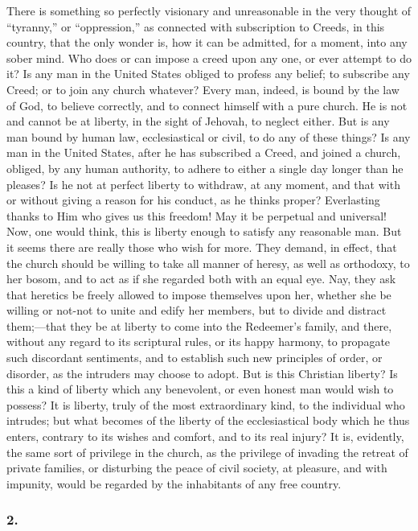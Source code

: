 \documentclass[
]{book}
\begin{document}
There is something so perfectly visionary and unreasonable in the very thought of ``tyranny,'' or ``oppression,'' as connected with subscription to Creeds, in this country, that the only wonder is, how it can be admitted, for a moment, into any sober mind. Who does or can impose a creed upon any one, or ever attempt to do it? Is any man in the United States obliged to profess any belief; to subscribe any Creed; or to join any church whatever? Every man, indeed, is bound by the law of God, to believe correctly, and to connect himself with a pure church. He is not and cannot be at liberty, in the sight of Jehovah, to neglect either. But is any man bound by human law, ecclesiastical or civil, to do any of these things? Is any man in the United States, after he has subscribed a Creed, and joined a church, obliged, by any human authority, to adhere to either a single day longer than he pleases? Is he not at perfect liberty to withdraw, at any moment, and that with or without giving a reason for his conduct, as he thinks proper? Everlasting thanks to Him who gives us this freedom! May it be perpetual and universal! Now, one would think, this is liberty enough to satisfy any reasonable man. But it seems there are really those who wish for more. They demand, in effect, that the church should be willing to take all manner of heresy, as well as orthodoxy, to her bosom, and to act as if she regarded both with an equal eye. Nay, they ask that heretics be freely allowed to impose themselves upon her, whether she be willing or not-not to unite and edify her members, but to divide and distract them;---that they be at liberty to come into the Redeemer's family, and there, without any regard to its scriptural rules, or its happy harmony, to propagate such discordant sentiments, and to establish such new principles of order, or disorder, as the intruders may choose to adopt. But is this Christian liberty? Is this a kind of liberty which any benevolent, or even honest man would wish to possess? It is liberty, truly of the most extraordinary kind, to the individual who intrudes; but what becomes of the liberty of the ecclesiastical body which he thus enters, contrary to its wishes and comfort, and to its real injury? It is, evidently, the same sort of privilege in the church, as the privilege of invading the retreat of private families, or disturbing the peace of civil society, at pleasure, and with impunity, would be regarded by the inhabitants of any free country.

\hypertarget{section-13}{%
\subsubsection*{2.}\label{section-13}}
\end{document}
